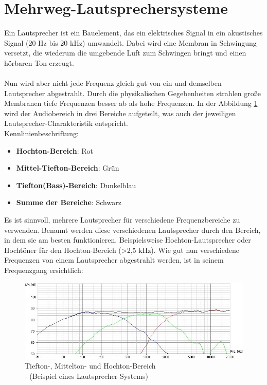 \section{Mehrweg-Lautsprechersysteme}\label{sec:3.2}
Ein Lautsprecher ist ein Bauelement, das ein elektrisches Signal in ein akustisches Signal (20 Hz bis 20 kHz) umwandelt.
Dabei wird eine Membran in Schwingung versetzt, die wiederum die umgebende Luft zum Schwingen bringt und einen hörbaren Ton erzeugt.
\\ \\
Nun wird aber nicht jede Frequenz gleich gut von ein und demselben Lautsprecher abgestrahlt.
Durch die physikalischen Gegebenheiten strahlen große Membranen tiefe Frequenzen besser ab als hohe Frequenzen.
In der Abbildung \ref{fig:3.2.1} wird der Audiobereich in drei Bereiche aufgeteilt, was auch der jeweiligen Lautsprecher-Charakteristik entspricht.\\
Kennlinienbeschriftung:\\
\begin{itemize}
	\item \textbf{Hochton-Bereich}: Rot
	\item \textbf{Mittel-Tiefton-Bereich}: Grün
	\item \textbf{Tiefton(Bass)-Bereich}: Dunkelblau
	\item \textbf{Summe der Bereiche}: Schwarz	
\end{itemize}
Es ist sinnvoll, mehrere Lautsprecher für verschiedene Frequenzbereiche zu verwenden.
Benannt werden diese verschiedenen Lautsprecher durch den Bereich, in dem sie am besten funktionieren.
Beispielsweise Hochton-Lautsprecher oder Hochtöner für den Hochton-Bereich (>2,5 kHz).
Wie gut nun verschiedene Frequenzen von einem Lautsprecher abgestrahlt werden, ist in seinem Frequenzgang ersichtlich:
\begin{figure} [H]
	\centering
	\includegraphics[width=1\textwidth]{img/Grundlagen/Mehrweg-Lautsprechersysteme/Frequenzbereiche-Audio-cut.jpg}
	\caption{Tiefton-, Mittelton- und Hochton-Bereich\\- (Beispiel eines Lautsprecher-Systems)}
	\label{fig:3.2.1}
\end{figure}

